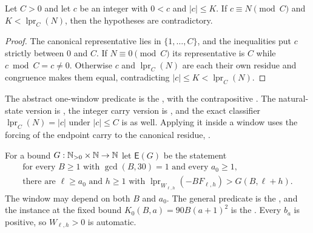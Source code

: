 \documentclass[11pt]{article}
\newcommand{\lpr}{\operatorname{lpr}}
\newcommand{\Esc}{\mathsf E}
\begin{document}
\begin{proposition}\label{long269:res:consumer}
Let $C>0$ and let $c$ be an integer with $0<c$ and $|c|\le K$.  If
$c\equiv N\pmod C$ and $K<\lpr_C(N)$, then the hypotheses are contradictory.
\end{proposition}

\begin{proof}
The canonical representative lies in $\{1,\ldots,C\}$, and the inequalities put
$c$ strictly between $0$ and $C$.  If $N\equiv0\pmod C$ its representative is
$C$ while $c\bmod C=c\ne0$.  Otherwise $c$ and $\lpr_C(N)$ are each their own
residue and congruence makes them equal, contradicting $|c|\le K<\lpr_C(N)$.
\end{proof}

\noindent The abstract one-window predicate is the
, with the contrapositive
.  The natural-state version is
,
the integer carry version is
,
and the exact classifier $\lpr_C(N)=|c|$ under $|c|\le C$ is
as well.  Applying it inside a window uses the forcing of the endpoint carry to
the canonical residue,
.

For a bound $G:\mathbb{N}_{>0}\times\mathbb{N}\to\mathbb{N}$ let $\Esc(G)$ be the statement
\begin{equation}\label{long269:eq:actual-escape}
 \begin{gathered}
 \text{for every }B\ge1\text{ with }\gcd(B,30)=1\text{ and every }a_0\ge1,\\
 \text{there are }\ell\ge a_0\text{ and }h\ge1\text{ with }
 \lpr_{W_{\ell,h}}(-BF_{\ell,h})>G(B,\ell+h) .
 \end{gathered}
\end{equation}
The window may depend on both $B$ and $a_0$.  The general predicate is the
, and the instance at the fixed bound
$K_0(B,a)=90B(a+1)^{2}$ is the
.  Every $b_a$ is positive, so $W_{\ell,h}>0$ is automatic.
\end{document}
